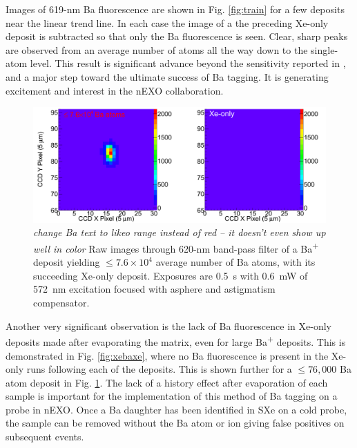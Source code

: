 Images of 619-nm Ba fluorescence are shown in Fig. \ref{fig:train} for a few deposits near the linear trend line.  In each case the image of a the preceding Xe-only deposit is subtracted so that only the Ba fluorescence is seen.  Clear, sharp peaks are observed from an average number of atoms all the way down to the single-atom level.  This result is significant advance beyond the sensitivity reported in \cite{Mong2015}, and a major step toward the ultimate success of Ba tagging.  It is generating excitement and interest in the nEXO collaboration.


\begin{figure} %
        \centering
                \includegraphics[width=.95\textwidth]{figures/xebaxe_largest_average.png}
                \caption{\emph{\color{gray}change Ba text to likeo range instead of red -- it doesn't even show up well in color} Raw images through 620-nm band-pass filter of a Ba\textsuperscript{+} deposit yielding $\leq 7.6 \times 10^{4}$ average number of Ba atoms, with its succeeding Xe-only deposit.  Exposures are 0.5~s with 0.6~mW of 572~nm excitation focused with asphere and astigmatism compensator.}
\label{fig:xebaxeLarger}
\end{figure}

Another very significant observation is the lack of Ba fluorescence in Xe-only deposits made after evaporating the matrix, even for large Ba\textsuperscript{+} deposits.  This is demonstrated in Fig. \ref{fig:xebaxe}, where no Ba fluorescence is present in the Xe-only runs following each of the deposits.  This is shown further for a $\leq 76,000$ Ba atom deposit in Fig. \ref{fig:xebaxeLarger}.  The lack of a history effect after evaporation of each sample is important for the implementation of this method of Ba tagging on a probe in nEXO.  Once a Ba daughter has been identified in SXe on a cold probe, the sample can be removed without the Ba atom or ion giving false positives on subsequent events.

